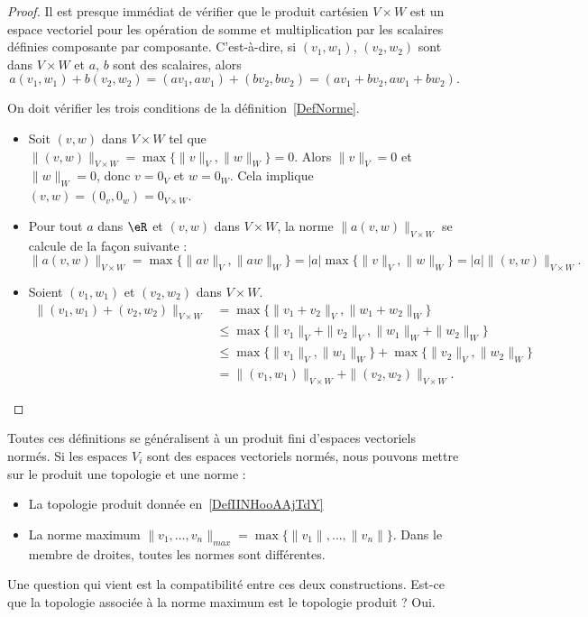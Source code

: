 \begin{proof}
    Il est presque immédiat de vérifier que le produit cartésien $V\times W$ est un espace vectoriel pour les opération de somme et multiplication par les scalaires définies composante par composante. C'est-à-dire,  si $(v_1,w_1)$, $(v_2,w_2)$ sont dans $V\times W$ et $a$, $b$ sont des scalaires, alors
    \begin{equation}
        a (v_1,w_1)+ b(v_2,w_2)=(av_1,aw_1)+ (bv_2,bw_2)=(av_1+bv_2,aw_1+bw_2).
    \end{equation}

	On doit vérifier les trois conditions de la définition~\ref{DefNorme}.
	\begin{itemize}
		\item Soit $(v,w)$ dans $V\times W$ tel que $\|(v,w)\|_{V\times W}=\max\{\|v\|_{V},\|w\|_W\}=0$. Alors $\|v\|_V=0$ et $\|w\|_W=0$, donc $v=0_V$ et $w=0_W$. Cela implique $(v,w)=(0_v,0_w)=0_{V\times W}$.
		\item Pour tout $a$ dans $\eR$ et $(v,w)$ dans $V\times W$, la norme $\|a (v,w)\|_{V\times W}$ se calcule de la façon suivante :
            \begin{equation}
                \|a (v,w)\|_{V\times W}= \max\{ \| av \|_V,\| aw \|_W \} =|a|\max\{\|v\|_{V},\|w\|_W\}=|a|\|(v,w)\|_{V\times W}.
            \end{equation}
		\item Soient $(v_1,w_1)$ et $(v_2,w_2)$ dans $V\times W$.
		\begin{equation}
			\begin{aligned}
				\|(v_1,w_1)+(v_2,w_2)\|_{V\times W}&=\max\{\|v_1+v_2\|_{V},\|w_1+w_2\|_W\}\\
				&\leq \max\{\|v_1\|_V+\|v_2\|_{V},\|w_1\|_W+\|w_2\|_W\}\\
				&\leq\max\{\|v_1\|_V,\|w_1\|_W\}+ \max\{\|v_2\|_{V},\|w_2\|_W\}\\
				&=\|(v_1,w_1)\|_{V\times W}+\|(v_2,w_2)\|_{V\times W}.
			\end{aligned}
		\end{equation}
	\end{itemize}
\end{proof}

Toutes ces définitions se généralisent à un produit fini d'espaces vectoriels normés. Si les espaces \( V_i\) sont des espaces vectoriels normés, nous pouvons mettre sur le produit une topologie et une norme :
\begin{itemize}
    \item La topologie produit donnée en~\ref{DefIINHooAAjTdY}
    \item La norme maximum \( \| v_1,\ldots, v_n \|_{max}=\max\{ \| v_1 \|,\ldots, \| v_n \| \}\). Dans le membre de droites, toutes les normes sont différentes.
\end{itemize}
Une question qui vient est la compatibilité entre ces deux constructions. Est-ce que la topologie associée à la norme maximum est le topologie produit ? Oui.

